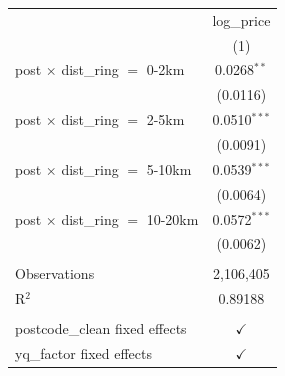    \begin{tabular}{lc}
      \toprule
                                             & log\_price\\   
                                             & (1)\\  
      \midrule 
      post $\times$ dist\_ring $=$ 0-2km     & 0.0268$^{**}$\\   
                                             & (0.0116)\\   
      post $\times$ dist\_ring $=$ 2-5km     & 0.0510$^{***}$\\   
                                             & (0.0091)\\   
      post $\times$ dist\_ring $=$ 5-10km    & 0.0539$^{***}$\\   
                                             & (0.0064)\\   
      post $\times$ dist\_ring $=$ 10-20km   & 0.0572$^{***}$\\   
                                             & (0.0062)\\   
       \\
      Observations                           & 2,106,405\\  
      R$^2$                                  & 0.89188\\  
       \\
      postcode\_clean fixed effects          & $\checkmark$\\   
      yq\_factor fixed effects               & $\checkmark$\\   
      \bottomrule
   \end{tabular}
